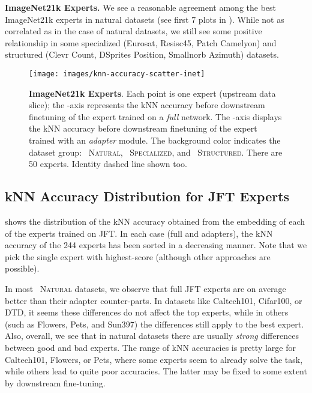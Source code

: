 \documentclass{article}
\newcommand{\JFT}{{JFT}\xspace}
\newcommand{\naturalsym}{{\protect\scalebox{1.5}{\color{naturalcolor!50}}}}
\newcommand{\specializedsym}{{\protect\scalebox{1.5}{\color{specializedcolor!50}}}}
\newcommand{\structuredsym}{{\protect\scalebox{1.5}{\color{structuredcolor!50}}}}
\begin{document}
\textbf{ImageNet21k Experts.} 
We see a reasonable agreement among the best ImageNet21k experts in natural datasets (see first 7 plots in ).
While not as correlated as in the case of natural datasets, we still see some positive relationship in some specialized (Eurosat, Resisc45, Patch Camelyon) and structured (Clevr Count, DSprites Position, Smallnorb Azimuth) datasets.

\begin{figure}[htb]
\texttt{[image: images/knn-accuracy-scatter-inet]}
\caption{\textbf{ImageNet21k Experts}.
Each point is one expert (upstream data slice); the -axis represents the kNN accuracy before downstream finetuning of the expert trained on a \emph{full} network. The -axis displays the kNN accuracy before downstream finetuning of the expert trained with an \emph{adapter} module.
The background color indicates the dataset group: 
{\naturalsym~\textsc{Natural}}, 
{\specializedsym~\textsc{Specialized}}, and
{\structuredsym~\textsc{Structured}}.
There are 50 experts. Identity dashed line shown too.}
\label{fig:app_inet_per_expert_knn}
\end{figure}









 
\subsection{kNN Accuracy Distribution for JFT Experts}

 shows the distribution of the kNN 
accuracy obtained from the embedding of each of the experts trained on \JFT.
In each case (full and adapters), the kNN accuracy of the 244 experts has been sorted in a decreasing manner.
Note that we pick the single expert with highest-score (although other approaches are possible).

In most {\naturalsym~\textsc{Natural}} datasets, we observe that full JFT experts are on average better
than their adapter counter-parts.
In datasets like Caltech101, Cifar100, or DTD, it seems these differences do not affect the top experts, 
while in others (such as Flowers, Pets, and Sun397) the differences still apply to the best expert.
Also, overall, we see that in natural datasets there are usually \emph{strong} differences between good 
and bad experts.
The range of kNN accuracies is pretty large for Caltech101, Flowers, or Pets, where 
some experts seem to already solve the task, while others lead to quite poor accuracies.
The latter may be fixed to some extent by downstream fine-tuning.
\end{document}
